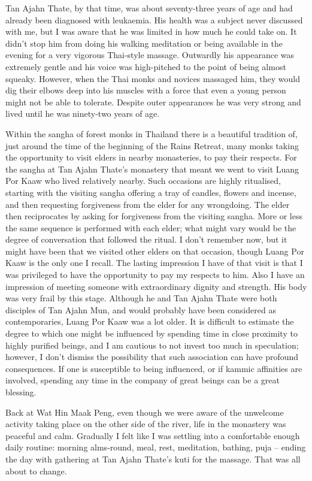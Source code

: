 Tan Ajahn Thate, by that time, was about seventy-three years of age and
had already been diagnosed with leukaemia. His health was a subject
never discussed with me, but I was aware that he was limited in how much
he could take on. It didn't stop him from doing his walking meditation
or being available in the evening for a very vigorous Thai-style
massage. Outwardly his appearance was extremely gentle and his voice was
high-pitched to the point of being almost squeaky. However, when the
Thai monks and novices massaged him, they would dig their elbows deep
into his muscles with a force that even a young person might not be able
to tolerate. Despite outer appearances he was very strong and lived
until he was ninety-two years of age\cite{thate}.

Within the sangha of forest monks in Thailand there is a beautiful
tradition of, just around the time of the beginning of the Rains
Retreat, many monks taking the opportunity to visit elders in nearby
monasteries, to pay their respects. For the sangha at Tan Ajahn Thate's
monastery that meant we went to visit Luang Por Kaaw who lived
relatively nearby. Such occasions are highly ritualised, starting with
the visiting sangha offering a tray of candles, flowers and incense, and
then requesting forgiveness from the elder for any wrongdoing. The elder
then reciprocates by asking for forgiveness from the visiting sangha.
More or less the same sequence is performed with each elder; what might
vary would be the degree of conversation that followed the ritual. I
don't remember now, but it might have been that we visited other elders
on that occasion, though Luang Por Kaaw is the only one I recall. The
lasting impression I have of that visit is that I was privileged to have
the opportunity to pay my respects to him. Also I have an impression of
meeting someone with extraordinary dignity and strength. His body was
very frail by this stage. Although he and Tan Ajahn Thate were both
disciples of Tan Ajahn Mun, and would probably have been considered as
contemporaries, Luang Por Kaaw was a lot older. It is difficult to
estimate the degree to which one might be influenced by spending time in
close proximity to highly purified beings, and I am cautious to not
invest too much in speculation; however, I don't dismiss the possibility
that such association can have profound consequences. If one is
susceptible to being influenced, or if kammic affinities are involved,
spending any time in the company of great beings can be a great
blessing.

Back at Wat Hin Maak Peng, even though we were aware of the unwelcome
activity taking place on the other side of the river, life in the
monastery was peaceful and calm. Gradually I felt like I was settling
into a comfortable enough daily routine: morning alms-round, meal, rest,
meditation, bathing, puja -- ending the day with gathering at Tan Ajahn
Thate's kuti for the massage. That was all about to change.

